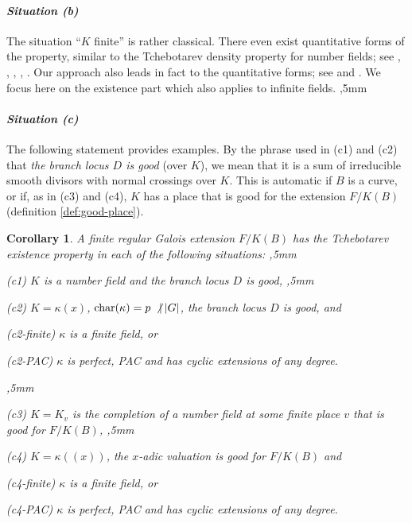 \documentclass[12pt,english]{amsart}
\newtheorem{twisting lemma}[theorem]{Twisting lemma}
\newtheorem{corollary}[theorem]{Corollary}
\begin{document}
\paragraph{\it Situation {\rm (b)} }
\vskip 1mm
The situation ``$K$ finite'' is rather classical. 
There even exist quantitative forms of the property, similar to the Tchebotarev density property for number fields;
see \cite{Weil_hermann}, \cite{Serre-zetaL}, \cite{fried-hilbert}, \cite{ekedahl}, \cite[\S 6]{FrJa}. Our approach also leads in fact  to the quantitative forms; see \cite[\S 3.5]{DEGha2} and \cite[\S 4.2]{DeLe2}. We focus here
on the existence part which also applies to infinite fields.
,5mm

\paragraph{\it Situation {\rm (c)} }
\vskip 1mm
The following statement provides examples. By the phrase used in (c1) and (c2) that {\it the branch locus $D$ is  good} (over $K$), we mean that it is a sum of irreducible smooth divisors with normal crossings over $K$. This is automatic if $B$ is a curve, or if, as in (c3) and (c4), $K$ has a 
place that is good for the extension $F/K(B)$ (definition \ref{def:good-place}).

\begin{corollary} \label{cor:examples} 
A finite regular Galois extension $F/K(B)$ has the Tchebotarev existence property in each of the following situations:
,5mm

\noindent
{\rm (c1)} $K$ is a number field and the branch locus $D$ is good,
,5mm

\noindent
{\rm (c2)} $K=\kappa(x)$, ${\rm char}(\kappa)=p\hskip2pt \not| \hskip2pt |G|$, 
the branch locus $D$ is good, and 

\noindent
\hskip 4mm
{\tenrm (c2-finite)} $\kappa$ is a finite field, or

\noindent
\hskip 4mm
{\tenrm (c2-PAC)} $\kappa$ is perfect, PAC and has cyclic extensions of any degree.

,5mm

\noindent
{\rm (c3)} $K=K_v$ is the completion of a number field at some finite place $v$ that is good for $F/K(B)$,
,5mm

\noindent
{\rm (c4)} $K=\kappa((x))$, the $x$-adic valuation is good for $F/K(B)$ and 

\noindent
\hskip 4mm {\tenrm (c4-finite)} $\kappa$ is a finite field, or

\noindent
\hskip 4mm
{\tenrm (c4-PAC)} $\kappa$ is perfect, PAC and has cyclic extensions of any degree.
\end{corollary}
\end{document}
